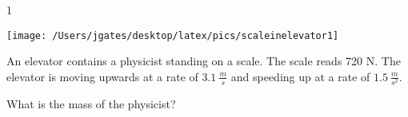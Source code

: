
\AddToShipoutPicture*{\BackgroundPic}

\addtocounter {ProbNum} {1}

\begin{floatingfigure}[r]{.2\textwidth}
\texttt{[image: /Users/jgates/desktop/latex/pics/scaleinelevator1]}
\end{floatingfigure}
 
{\bf \Large{}} An elevator contains a physicist standing on a scale. The scale reads 720 N. The elevator is moving upwards at a rate of ${3.1~\tfrac{m}{s}}$ and speeding up at a rate of ${1.5~\tfrac{m}{s^2}}$.

\bigskip
What is the mass of the physicist?




\vfill
\newpage
